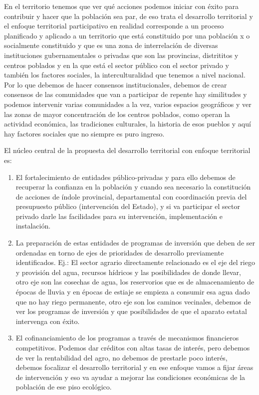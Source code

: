 \documentclass[
  a4paper,
]{article}
\providecommand{\tightlist}{%
  \setlength{\itemsep}{0pt}\setlength{\parskip}{0pt}}\usepackage{longtable,booktabs,array}
\begin{document}
En el territorio tenemos que ver qué acciones podemos iniciar con éxito
para contribuir y hacer que la población sea par, de eso trata el
desarrollo territorial y el enfoque territorial participativo en
realidad corresponde a un proceso planificado y aplicado a un territorio
que está constituido por una población x o socialmente constituido y que
es una zona de interrelación de diversas instituciones gubernamentales o
privadas que son las provincias, distrititos y centros poblados y en la
que está el sector público con el sector privado y también los factores
sociales, la interculturalidad que tenemos a nivel nacional. Por lo que
debemos de hacer consensos institucionales, debemos de crear consensos
de las comunidades que van a participar de repente hay similitudes y
podemos intervenir varias comunidades a la vez, varios espacios
geográficos y ver las zonas de mayor concentración de los centros
poblados, como operan la actividad económica, las tradiciones
culturales, la historia de esos pueblos y aquí hay factores sociales que
no siempre es puro ingreso.

El núcleo central de la propuesta del desarrollo territorial con enfoque
territorial es:

\begin{enumerate}
\def\labelenumi{\arabic{enumi}.}
\tightlist
\item
  El fortalecimiento de entidades público-privadas y para ello debemos
  de recuperar la confianza en la población y cuando sea necesario la
  constitución de acciones de índole provincial, departamental con
  coordinación previa del presupuesto público (intervención del Estado),
  y si va participar el sector privado darle las facilidades para su
  intervención, implementación e instalación.
\item
  La preparación de estas entidades de programas de inversión que deben
  de ser ordenadas en torno de ejes de prioridades de desarrollo
  previamente identificados. Ej.: El sector agrario directamente
  relacionado es el eje del riego y provisión del agua, recursos
  hídricos y las posibilidades de donde llevar, otro eje son las
  cosechas de agua, los reservorios que es de almacenamiento de épocas
  de lluvia y en épocas de estiaje se empieza a consumir esa agua dado
  que no hay riego permanente, otro eje son los caminos vecinales,
  debemos de ver los programas de inversión y que posibilidades de que
  el aparato estatal intervenga con éxito.
\item
  El cofinanciamiento de los programas a través de mecanismos
  financieros competitivos. Podemos dar créditos con altas tasas de
  interés, pero debemos de ver la rentabilidad del agro, no debemos de
  prestarle poco interés, debemos focalizar el desarrollo territorial y
  en ese enfoque vamos a fijar áreas de intervención y eso va ayudar a
  mejorar las condiciones económicas de la población de ese piso
  ecológico.
\end{enumerate}
\end{document}
